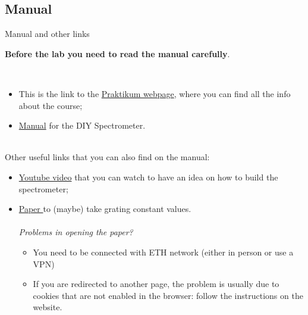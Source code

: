 \documentclass[9pt, xcolor=dvipsnames]{beamer}
\begin{document}
\subsection{Manual }
\begin{frame}{Manual and other links}

\textbf{Before the lab you need to read the manual carefully}.

~\\

\begin{itemize}
	\item This is the link to the  \textcolor{blue}{\href{https://ap.phys.ethz.ch/}{Praktikum webpage}}, where you can find all the info about the course;
	\item \textcolor{blue}{\href{https://ap.phys.ethz.ch/83.html}{Manual} } for the DIY Spectrometer.
\end{itemize}

~\\


Other useful links that you can also find on the manual:
\begin{itemize}
	\item \textcolor{blue}{\href{https://www.youtube.com/watch?v=fl42pnUbCCA}{Youtube video}} that you can watch to have an idea on how to build the spectrometer;
	\item \textcolor{blue}{\href{https://ieeexplore.ieee.org/stamp/stamp.jsp?tp=\&arnumber=5547333\&tag=1}{Paper }}to (maybe) take grating constant values.\\
	~\\
	\textit{Problems in opening the paper?} 
	\begin{itemize}
		\item You need to be connected with ETH network (either in person or use a VPN)
		\item If you are redirected to another page, the problem is usually due to cookies that are not enabled in the browser: follow the instructions on the website.
	\end{itemize}
\end{itemize}

\end{frame}
\end{document}
